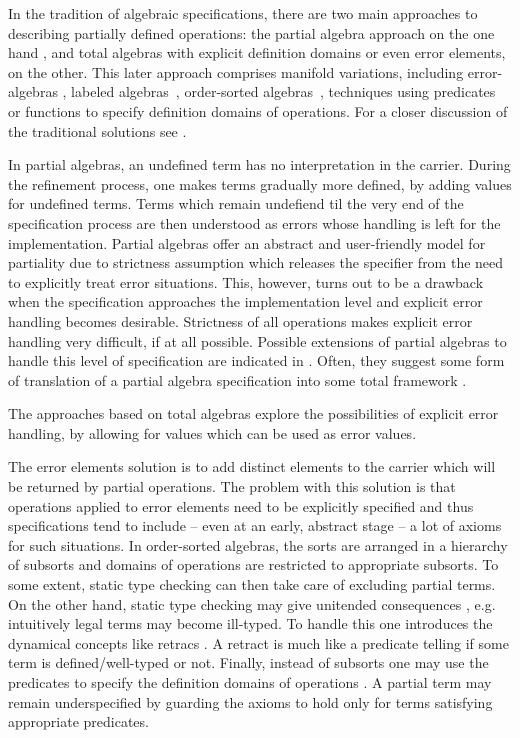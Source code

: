 \documentclass[10pt]{article}
\begin{document}
In the tradition of algebraic specifications, there are two main
approaches to describing partially defined operations: the partial algebra approach
on the one hand \cite{burm,reichel,state}, and total algebras with explicit
definition domains or even error elements,
on the other. This later approach comprises manifold variations, including
error-algebras \cite{error}, labeled algebras~\cite{label}, 
order-sorted algebras~\cite{order1}, techniques using predicates \cite{member} or
functions \cite{guard} to specify definition domains of operations. For a closer
discussion of the traditional solutions see \cite{sort}.%

In
partial algebras, an undefined term has no interpretation in the
carrier. During the refinement process, one makes terms gradually more
defined, by adding values for undefined terms. Terms which remain undefiend
til the very end of the specification process are then understood as errors whose
handling is left for the implementation. Partial algebras offer an
abstract and user-friendly model for partiality due to strictness assumption
which releases the specifier from the need to explicitly treat error
situations. This, however, turns out to be a drawback when the specification
approaches the implementation level and explicit error handling becomes
desirable. Strictness of all operations makes explicit error handling very
difficult, if at all possible. Possible extensions of partial algebras to
handle this level of specification are indicated in \cite{state,lazy}. Often,
they suggest some form of translation of a partial algebra
specification into some total framework \cite{state}.

The approaches based on total algebras explore the possibilities of explicit
error handling, by allowing for values which can be used as error values. 

The error elements solution is  to add distinct elements to the carrier which
will be returned by partial operations. The problem with this solution is
that operations applied to error elements need to be explicitly specified and
thus specifications tend to include -- even at an early, abstract stage -- a
lot of axioms for such situations.
In order-sorted algebras, the sorts are arranged in a hierarchy of subsorts
and domains of operations are restricted to appropriate subsorts. To some
extent, static type checking can then take care of excluding partial
terms. On the other hand, 
static type checking may give unitended consequences \cite{state},
e.g. intuitively legal terms may become ill-typed. To handle this one
introduces the dynamical concepts
like retracs \cite{order}. A retract is much like a
predicate telling if some term is defined/well-typed or not.
Finally, instead of subsorts one may use the predicates to specify the
definition domains of operations \cite{member}. A partial term may remain underspecified by
guarding the axioms to hold only for terms satisfying appropriate predicates.
\end{document}
